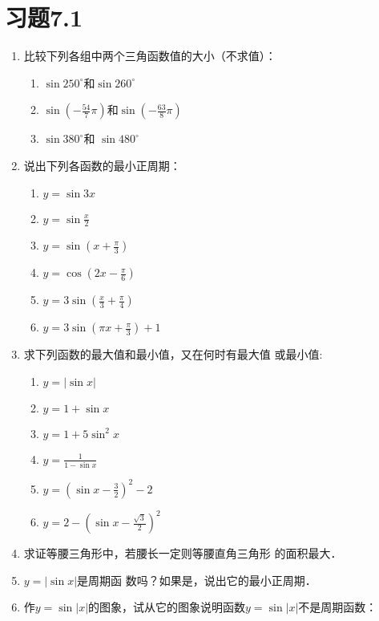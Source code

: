 \section*{习题7.1}
\begin{enumerate}
    \item 比较下列各组中两个三角函数值的大小（不求值）：
    \begin{enumerate}
        \item $\sin250^{\circ}$和$\sin260^{\circ}$
        \item $\sin\left(-\frac{54}{7}\pi\right)$和$\sin\left(-\frac{63}{8}\pi\right)$
        \item $\sin380^{\circ}$和 $\sin480^{\circ}$
    \end{enumerate}
    
    \item 说出下列各函数的最小正周期：
\begin{multicols}{2}
    \begin{enumerate}
        \item $y=\sin 3x$
        \item $y=\sin\frac{x}{2}$
        \item $y=\sin \left(x+\frac{\pi}{3}\right)$
        \item $y=\cos \left(2 x-\frac{\pi}{6}\right)$
        \item $y=3 \sin \left(\frac{x}{3}+\frac{\pi}{4}\right)$
        \item $y=3 \sin \left(\pi x+\frac{\pi}{3}\right)+1$
    \end{enumerate}
\end{multicols}

\item 求下列函数的最大值和最小值，又在何时有最大值
或最小值:
\begin{multicols}{2}
    \begin{enumerate}
\item $y=|\sin x|$
\item $y=1+\sin x$
\item $y=1+5 \sin ^{2} x$
\item $y=\frac{1}{1-\sin x}$
\item $y=\left(\sin x-\frac{3}{2}\right)^{2}-2 $
\item $y=2-\left(\sin x-\frac{\sqrt{3}}{2}\right)^{2}$
    \end{enumerate}
\end{multicols}

\item 求证等腰三角形中，若腰长一定则等腰直角三角形
的面积最大．
\item $y=|\sin x|$是周期函
数吗？如果是，说出它的最小正周期．
\item 作$y=\sin|x|$的图象，试从它的图象说明函数$y=\sin|x|$不是周期函数：


\end{enumerate}
